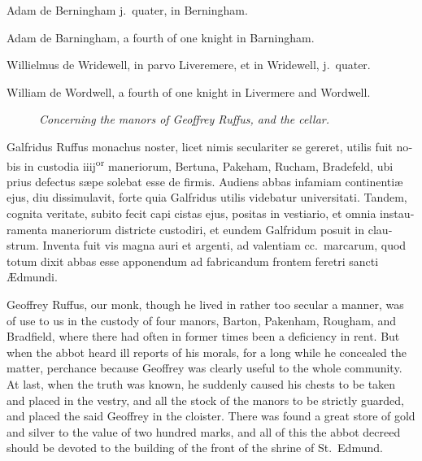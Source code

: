 \documentclass[10pt]{book}
\newcommand{\blockhead}[4][]{
\begin{figure}
\centering
\vspace{#4}
\parbox{2.75cm}{\begin{center}\footnotesize \color{BrickRed} \emph{#2}\\ #1 \end{center}}
\end{figure}
}
\begin{document}
\begin{paracol}{2}
\switchcolumn*

\begin{otherlanguage}{latin}
Adam de Berningham j.\ quater, in Berningham.
\end{otherlanguage}

\switchcolumn

Adam de Barningham, a fourth of one knight in Barningham.

\switchcolumn*

\begin{otherlanguage}{latin}
Willielmus de Wridewell, in parvo Liveremere, et in Wridewell, j.\ quater.
\end{otherlanguage}

\switchcolumn

William de Wordwell, a fourth of one knight in Livermere and Wordwell.

\switchcolumn*

\begin{otherlanguage}{latin}
\blockhead{Concerning the manors of Geoffrey Ruffus, and the cellar.}{4}{-.45cm}
Galfridus Ruffus monachus noster, licet nimis seculariter se gereret, utilis fuit nobis in custodia iiij\textsuperscript{or} maneriorum, Bertuna, Pakeham, Rucham, Bradefeld, ubi prius defectus s\ae{}pe solebat esse de firmis. Audiens abbas infamiam continenti\ae{} ejus, diu dissimulavit, forte quia Galfridus utilis videbatur universitati. Tandem, cognita veritate, subito fecit capi cistas ejus, positas in vestiario, et omnia instauramenta maneriorum districte custodiri, et eundem Galfridum posuit in claustrum. Inventa fuit vis magna auri et argenti, ad valentiam cc.\ marcarum, quod totum dixit abbas esse apponendum ad fabricandum frontem feretri sancti \AE{}dmundi. 

\end{otherlanguage}

\switchcolumn

Geoffrey Ruffus, our monk, though he lived in rather too secular a manner, was of use to us in the custody of four manors, Barton, Pakenham, Rougham, and Bradfield, where there had often in former times been a deficiency in rent. But when the abbot heard ill reports of his morals, for a long while he concealed the matter, perchance because Geoffrey was clearly useful to the whole community. At last, when the truth was known, he suddenly caused his chests to be taken and placed in the vestry, and all the stock of the manors to be strictly guarded, and placed the said Geoffrey in the cloister. There was found a great store of gold and silver to the value of two hundred marks, and all of this the abbot decreed should be devoted to the building of the front of the shrine of St.\ Edmund.


\end{paracol}
\end{document}
